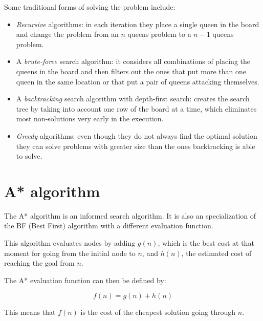 \documentclass[]{llncs}
\begin{document}
Some traditional forms of solving the problem include:
\begin{itemize}
    \item \textit{Recursive} algorithms: in each iteration they place a single queen in the board and change the problem from an $n$ queens problem to a $n - 1$ queens problem.
    \item A \textit{brute-force} search algorithm: it considers all combinations of placing the queens in the board and then filters out the ones that put more than one queen in the same location or that put a pair of queens attacking themselves.
    \item A \textit{backtracking} search algorithm with depth-first search: creates the search tree by taking into account one row of the board at a time, which eliminates most non-solutions very early in the execution.
    \item \textit{Greedy} algorithms: even though they do not always find the optimal solution they can solve problems with greater size than the ones backtracking is able to solve.
\end{itemize}
\section{A* algorithm}\label{astar_alg}
The A* algorithm \cite{inteligencia-artificial,artificial-intelligence-1} is an informed search algorithm. It is also an specialization of the BF (Best First) algorithm with a different evaluation function. 

This algorithm evaluates nodes by adding $g(n)$, which is the best cost at that moment for going from the initial node to $n$, and $h(n)$, the estimated cost of reaching the goal from $n$.

The A* evaluation function can then be defined by:

\[f(n) = g(n) + h(n)\] 

This means that $f(n)$ is the cost of the cheapest solution going through $n$.
\end{document}
